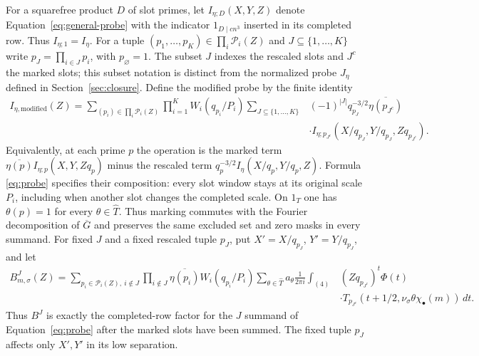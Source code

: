 \documentclass[12pt]{article}
\begin{document}
For a squarefree product $D$ of slot primes, let
$I_{\eta;D}(X,Y,Z)$ denote Equation~\eqref{eq:general-probe} with
the indicator $1_{D\mid cn^3}$ inserted in its completed row.
Thus $I_{\eta;1}=I_\eta$.  For a tuple
$(p_1,\ldots,p_K)\in\prod_i\mathcal P_i(Z)$ and
$J\subseteq\{1,\ldots,K\}$ write $p_J=\prod_{i\in J}p_i$, with
$p_\varnothing=1$.  The subset $J$ indexes the rescaled slots and $J^c$
the marked slots; this subset notation is distinct from the normalized
probe $J_\eta$ defined in Section~\ref{sec:closure}.  Define the modified probe by the finite identity
\begin{equation}\label{eq:probe}
\begin{split}
 I_{\eta,\mathrm{modified}}(Z)
 =\sum_{(p_i)\in\prod_i\mathcal P_i(Z)}\prod_{i=1}^K W_i(q_{p_i}/P_i)
 \sum_{J\subseteq\{1,\ldots,K\}}&(-1)^{|J|}q_{p_J}^{-3/2}
          \overline{\eta(p_{J^c})}\\
 &\cdot I_{\eta;p_{J^c}}
       (X/q_{p_J},Y/q_{p_J},Zq_{p_{J^c}}).
\end{split}
\end{equation}
Equivalently, at each prime $p$ the operation is the marked term
$\overline{\eta(p)}I_{\eta;p}(X,Y,Zq_p)$ minus the rescaled term
$q_p^{-3/2}I_\eta(X/q_p,Y/q_p,Z)$.  Formula
\eqref{eq:probe} specifies their composition:
every slot window stays at its original scale $P_i$, including when
another slot changes the completed scale.  On $1_T$ one has
$\theta(p)=1$ for every $\theta\in\widehat T$.  Thus marking commutes
with the Fourier decomposition of $\overline G$ and preserves the
same excluded set and zero masks in every summand.
For fixed $J$ and a fixed rescaled tuple $p_J$, put
$X'=X/q_{p_J}$, $Y'=Y/q_{p_J}$, and let
\[
\begin{split}
 B^J_{m,\sigma}(Z)=
 \sum_{p_i\in\mathcal P_i(Z),\ i\notin J}
 \prod_{i\notin J}\overline{\eta(p_i)}W_i(q_{p_i}/P_i)
 \sum_{\theta\in\widehat T}a_\theta\frac1{2\pi i}
 \int_{(4)} &(Zq_{p_{J^c}})^t\Phi(t)\\
 &\cdot T_{p_{J^c}}(t+1/2,
             \nu_\sigma\theta\chi_\bullet(m))\,dt.
\end{split}
\]
Thus $B^J$ is exactly the completed-row factor for the $J$ summand
of Equation~\eqref{eq:probe} after the
marked slots have been summed.  The fixed tuple $p_J$ affects
only $X',Y'$ in its low separation.
\end{document}

